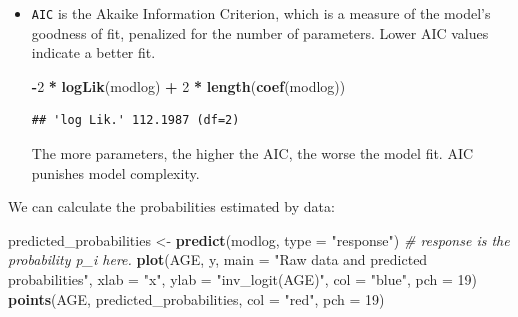 \documentclass[
]{book}
\newenvironment{Shaded}{\begin{snugshade}}{\end{snugshade}}
\newcommand{\AttributeTok}[1]{\textcolor[rgb]{0.13,0.29,0.53}{#1}}
\newcommand{\CommentTok}[1]{\textcolor[rgb]{0.56,0.35,0.01}{\textit{#1}}}
\newcommand{\DecValTok}[1]{\textcolor[rgb]{0.00,0.00,0.81}{#1}}
\newcommand{\FunctionTok}[1]{\textcolor[rgb]{0.13,0.29,0.53}{\textbf{#1}}}
\newcommand{\NormalTok}[1]{#1}
\newcommand{\OtherTok}[1]{\textcolor[rgb]{0.56,0.35,0.01}{#1}}
\newcommand{\SpecialCharTok}[1]{\textcolor[rgb]{0.81,0.36,0.00}{\textbf{#1}}}
\newcommand{\StringTok}[1]{\textcolor[rgb]{0.31,0.60,0.02}{#1}}
\begin{document}
\begin{itemize}
\begin{Shaded}
\begin{Highlighting}[]
 \SpecialCharTok{{-}}\DecValTok{2} \SpecialCharTok{*} \FunctionTok{logLik}\NormalTok{(modlog)}
\end{Highlighting}
\end{Shaded}

\begin{verbatim}
## 'log Lik.' 108.1987 (df=2)
\end{verbatim}
\item
  \texttt{AIC} is the Akaike Information Criterion,
  which is a measure of the model's goodness of fit,
  penalized for the number of parameters. Lower AIC values indicate a better fit.

\begin{Shaded}
\begin{Highlighting}[]
\SpecialCharTok{{-}}\DecValTok{2} \SpecialCharTok{*} \FunctionTok{logLik}\NormalTok{(modlog) }\SpecialCharTok{+} \DecValTok{2} \SpecialCharTok{*} \FunctionTok{length}\NormalTok{(}\FunctionTok{coef}\NormalTok{(modlog))}
\end{Highlighting}
\end{Shaded}

\begin{verbatim}
## 'log Lik.' 112.1987 (df=2)
\end{verbatim}

  The more parameters, the higher the AIC, the worse the model fit.
  AIC punishes model complexity.
\end{itemize}

We can calculate the probabilities estimated by data:

\begin{Shaded}
\begin{Highlighting}[]
\NormalTok{predicted\_probabilities }\OtherTok{\textless{}{-}} \FunctionTok{predict}\NormalTok{(modlog, }\AttributeTok{type =} \StringTok{"response"}\NormalTok{) }\CommentTok{\# response is the probability p\_i here.}
\FunctionTok{plot}\NormalTok{(AGE, y, }\AttributeTok{main =} \StringTok{"Raw data and predicted probabilities"}\NormalTok{,}
     \AttributeTok{xlab =} \StringTok{"x"}\NormalTok{, }\AttributeTok{ylab =} \StringTok{"inv\_logit(AGE)"}\NormalTok{, }\AttributeTok{col =} \StringTok{"blue"}\NormalTok{, }\AttributeTok{pch =} \DecValTok{19}\NormalTok{)}
\FunctionTok{points}\NormalTok{(AGE, predicted\_probabilities, }\AttributeTok{col =} \StringTok{"red"}\NormalTok{, }\AttributeTok{pch =} \DecValTok{19}\NormalTok{)}
\end{Highlighting}
\end{Shaded}
\end{document}
